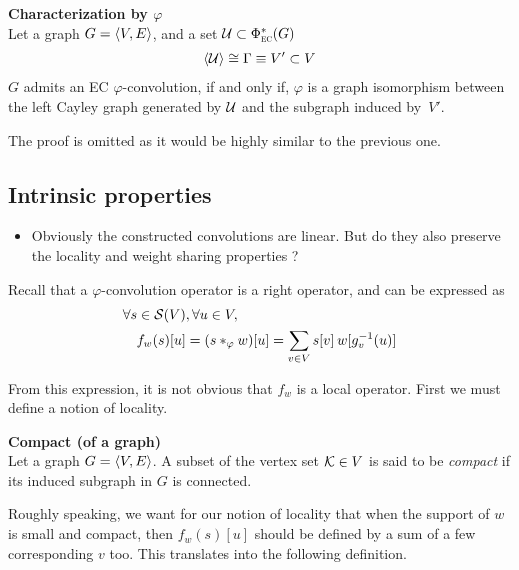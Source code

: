 \begin{corollary}\textbf{Characterization by $\varphi$}\\
Let a graph $\gve$, and a set $\cu \subset \Phi^*_{\EC}(G)$ \st
\begin{gather*}
\langle \cu \rangle \cong \Gamma \equiv V' \subset V
\end{gather*}
$G$ admits an EC $\varphi$-convolution, if and only if, $\varphi$ is a graph isomorphism between the left Cayley graph generated by $\cu$ and the subgraph induced by~$V'$.
\label{cor:cayley}
\end{corollary}
The proof is omitted as it would be highly similar to the previous one.

\subsection{Intrinsic properties}

\begin{itemize}
  \item Obviously the constructed convolutions are linear. But do they also preserve the locality and weight sharing properties ?
\end{itemize}

Recall that a $\varphi$-convolution operator is a right operator, and can be expressed as
\begin{align}
\forall s \in \cs(V) &, \forall u \in V,\nonumber\\
f_w(s)[u] & = (s \ast_{\varphi} w) [u]\nonumber
            = \displaystyle\sum_{v \in V} s[v] \h{2} w[g_v^{-1}(u)] \label{eq:sum}
\end{align}

From this expression, it is not obvious that $f_w$ is a local operator. First we must define a notion of locality.

\begin{definition}\textbf{Compact (of a graph)}\\
Let a graph $\gve$. A subset of the vertex set $\ck \in V$ is said to be \emph{compact} if its induced subgraph in $G$ is connected.
\end{definition}

Roughly speaking, we want for our notion of locality that when the support of $w$ is small and compact, then $f_w(s)[u]$ should be defined by a sum of a few corresponding $v$ too. This translates into the following definition.

